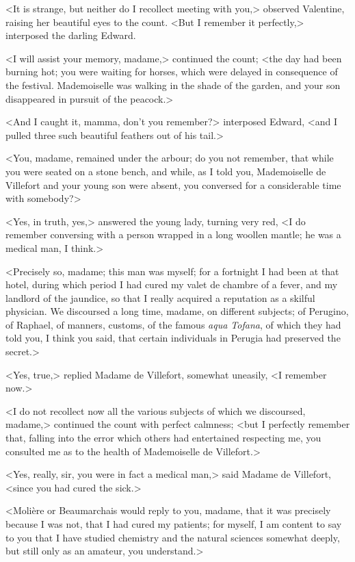  <It is strange, but neither do I recollect meeting with you,> observed Valentine, raising her beautiful eyes to the count.  <But I remember it perfectly,> interposed the darling Edward. 

 <I will assist your memory, madame,> continued the count; <the day had been burning hot; you were waiting for horses, which were delayed in consequence of the festival. Mademoiselle was walking in the shade of the garden, and your son disappeared in pursuit of the peacock.> 

 <And I caught it, mamma, don't you remember?> interposed Edward, <and I pulled three such beautiful feathers out of his tail.> 

 <You, madame, remained under the arbour; do you not remember, that while you were seated on a stone bench, and while, as I told you, Mademoiselle de Villefort and your young son were absent, you conversed for a considerable time with somebody?> 

 <Yes, in truth, yes,> answered the young lady, turning very red, <I do remember conversing with a person wrapped in a long woollen mantle; he was a medical man, I think.> 

 <Precisely so, madame; this man was myself; for a fortnight I had been at that hotel, during which period I had cured my valet de chambre of a fever, and my landlord of the jaundice, so that I really acquired a reputation as a skilful physician. We discoursed a long time, madame, on different subjects; of Perugino, of Raphael, of manners, customs, of the famous \textit{aqua Tofana}, of which they had told you, I think you said, that certain individuals in Perugia had preserved the secret.> 

 <Yes, true,> replied Madame de Villefort, somewhat uneasily, <I remember now.> 

 <I do not recollect now all the various subjects of which we discoursed, madame,> continued the count with perfect calmness; <but I perfectly remember that, falling into the error which others had entertained respecting me, you consulted me as to the health of Mademoiselle de Villefort.> 

 <Yes, really, sir, you were in fact a medical man,> said Madame de Villefort, <since you had cured the sick.> 

 <Molière or Beaumarchais would reply to you, madame, that it was precisely because I was not, that I had cured my patients; for myself, I am content to say to you that I have studied chemistry and the natural sciences somewhat deeply, but still only as an amateur, you understand.> 

